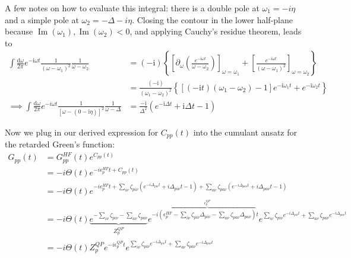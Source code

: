 \begin{tcolorbox}
A few notes on how to evaluate this integral: there is a double pole at $\omega_1 = -i\eta$ and a simple pole at $\omega_2 = -\Delta - i\eta$. Closing the contour in the lower half-plane because $\operatorname{Im}\left(\omega_1\right), \operatorname{Im}\left(\omega_2\right)<0$, and applying Cauchy's residue theorem, leads to
\begin{align}
    \int \frac{\mathrm{d} \omega}{2 \pi} e^{-\mathrm{i} \omega t} \frac{1}{\left(\omega-\omega_1\right)^2} \frac{1}{\omega-\omega_2} & =(-\mathrm{i})\left\{\left[\partial_\omega\left(\frac{e^{-\mathrm{i} \omega t}}{\omega-\omega_2}\right)\right]_{\omega=\omega_1}+\left[\frac{e^{-\mathrm{i} \omega t}}{\left(\omega-\omega_1\right)^2}\right]_{\omega=\omega_2}\right\} \\
    & =\frac{(-\mathrm{i})}{\left(\omega_1-\omega_2\right)^2}\left\{\left[(-\mathrm{i} t)\left(\omega_1-\omega_2\right)-1\right] e^{-\mathrm{i} \omega_1 t}+e^{-\mathrm{i} \omega_2 t}\right\}\\
\implies \int \frac{\mathrm{d} \omega}{2 \pi} e^{-i \omega t} \frac{1}{[\omega-(0-\mathrm{i} \eta)]^2} \frac{1}{\omega-\Delta}&=\frac{-\mathrm{i}}{\Delta^2}\left(e^{-\mathrm{i} \Delta t}+\mathrm{i} \Delta t-1\right)
\end{align}
\end{tcolorbox}
Now we plug in our derived expression for $C_{pp}(t)$ into the cumulant ansatz for the retarded Green's function:
\begin{align}
G_{pp}(t) & = G_{pp}^{HF}(t) e^{C_{pp}(t)} \\
& = -i \Theta(t) e^{-i \epsilon_p^{HF} t + C_{pp}(t)} \\
& = -i \Theta(t) e^{-i \epsilon_p^{HF} t + \sum_{i\nu} \zeta_{pi\nu}\left(e^{-i\Delta_{pi\nu} t} + i\Delta_{pi\nu} t - 1\right) + \sum_{a\nu} \zeta_{pa\nu} \left(e^{-i\Delta_{pa\nu} t} + i\Delta_{pa\nu} t - 1\right)}\\
& = -i \Theta(t) \underbrace{e^{-\sum_{i\nu} \zeta_{pi\nu} - \sum_{a\nu} \zeta_{pa\nu}}}_{Z_p^{QP}} e^{-i\overbrace{\left(\epsilon_p^{HF} - \sum_{i\nu} \zeta_{pi\nu}\Delta_{pi\nu} - \sum_{a\nu} \zeta_{pa\nu}\Delta_{pa\nu}\right)}^{\epsilon_p^{QP}} t} e^{\sum_{i\nu} \zeta_{pi\nu} e^{-i\Delta_{pi\nu} t} + \sum_{a\nu} \zeta_{pa\nu} e^{-i\Delta_{pa\nu} t}} \\ 
& = -i \Theta(t) Z_p^{QP} e^{-i \epsilon_p^{QP} t} e^{\sum_{i\nu} \zeta_{pi\nu} e^{-i\Delta_{pi\nu} t} + \sum_{a\nu} \zeta_{pa\nu} e^{-i\Delta_{pa\nu} t}} \\
\end{align}
